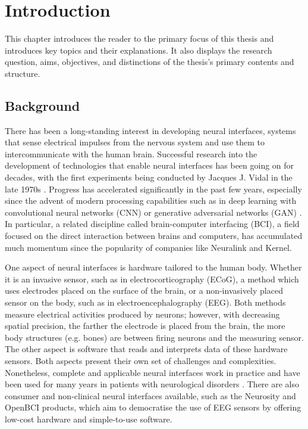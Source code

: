 \chapter{Introduction}
\graphicspath{{Chapter1/Figs/}{Chapter1/Figs/}}

This chapter introduces the reader to the primary focus of this thesis and introduces key topics and their explanations. It also displays the research question, aims, objectives, and distinctions of the thesis's primary contents and structure.

\section{Background}
\label{chapter1-background}

There has been a long-standing interest in developing neural interfaces, systems that sense electrical impulses from the nervous system and use them to intercommunicate with the human brain. Successful research into the development of technologies that enable neural interfaces has been going on for decades, with the first experiments being conducted by Jacques J. Vidal in the late 1970s \citep{vidal_real-time_1977}. Progress has accelerated significantly in the past few years, especially since the advent of modern processing capabilities such as in deep learning with convolutional neural networks (CNN) or generative adversarial networks (GAN) \citep{gonfalonieri_deep_2019}. In particular, a related discipline called brain-computer interfacing (BCI), a field focused on the direct interaction between brains and computers, has accumulated much momentum since the popularity of companies like Neuralink and Kernel.

One aspect of neural interfaces is hardware tailored to the human body. Whether it is an invasive sensor, such as in electrocorticography (ECoG), a method which uses electrodes placed on the surface of the brain, or a non-invasively placed sensor on the body, such as in electroencephalography (EEG). Both methods measure electrical activities produced by neurons; however, with decreasing spatial precision, the farther the electrode is placed from the brain, the more body structures (e.g. bones) are between firing neurons and the measuring sensor. The other aspect is software that reads and interprets data of these hardware sensors. Both aspects present their own set of challenges and complexities. Nonetheless, complete and applicable neural interfaces work in practice and have been used for many years in patients with neurological disorders \citep{braingate_publications_nodate}. There are also consumer and non-clinical neural interfaces available, such as the Neurosity and OpenBCI products, which aim to democratise the use of EEG sensors by offering low-cost hardware and simple-to-use software.

